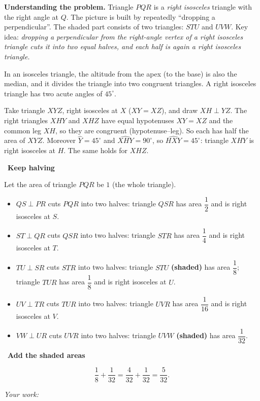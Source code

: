\documentclass[11pt]{article}
\newif\ifsol \solfalse
\newcommand{\probsol}[1]{%
  \begin{lrbox}{\solmeasure}\begin{minipage}{\dimexpr\linewidth-24pt\relax}#1\end{minipage}\end{lrbox}%
  \ifsol
    \begin{solbox}#1\end{solbox}%
  \else
    \setlength{\solht}{\dimexpr\ht\solmeasure+\dp\solmeasure+0.85cm\relax}%
    \ifdim\solht<1.35cm\setlength{\solht}{1.35cm}\fi
    \ifdim\solht>\StudentMaxWork\setlength{\solht}{\StudentMaxWork}\fi
    \begin{tcolorbox}[colback=white,colframe=Line,boxrule=0.8pt,arc=5pt,
      left=8pt,right=8pt,top=4pt,bottom=4pt,height=\solht]{\footnotesize\color{Slate}\itshape\WorkWord}\end{tcolorbox}%
  \fi}
\newlength{\StudentMaxWork}\setlength{\StudentMaxWork}{7.5cm}
\newcommand{\step}[2]{\par\smallskip\noindent{\bfseries\color{tmBlue!85!black}\StepWord~#1.}\ {\bfseries #2}\par\nopagebreak}
\def\WorkWord{Your work:}
\def\StepWord{Step}
\begin{document}
\probsol{
\textbf{Understanding the problem.} Triangle $PQR$ is a \emph{right isosceles} triangle with the right angle at $Q$. The picture is built by repeatedly ``dropping a perpendicular''. The shaded part consists of two triangles: $STU$ and $UVW$. Key idea: \emph{dropping a perpendicular from the right-angle vertex of a right isosceles triangle cuts it into two equal halves, and each half is again a right isosceles triangle.}

\begin{recallbox}In an isosceles triangle, the altitude from the apex (to the base) is also the median, and it divides the triangle into two congruent triangles. A right isosceles triangle has two acute angles of $45^\circ$.\end{recallbox}

\begin{proofbox}Take triangle $XYZ$, right isosceles at $X$ ($XY=XZ$), and draw $XH\perp YZ$. The right triangles $XHY$ and $XHZ$ have equal hypotenuses $XY=XZ$ and the common leg $XH$, so they are congruent (hypotenuse--leg). So each has half the area of $XYZ$. Moreover $\widehat{Y}=45^\circ$ and $\widehat{XHY}=90^\circ$, so $\widehat{HXY}=45^\circ$: triangle $XHY$ is right isosceles at $H$. The same holds for $XHZ$.\end{proofbox}

\step{1}{Keep halving}
Let the area of triangle $PQR$ be $1$ (the whole triangle).
\begin{itemize}[leftmargin=1.4em,itemsep=1pt]
\item $QS\perp PR$ cuts $PQR$ into two halves: triangle $QSR$ has area $\dfrac12$ and is right isosceles at $S$.
\item $ST\perp QR$ cuts $QSR$ into two halves: triangle $STR$ has area $\dfrac14$ and is right isosceles at $T$.
\item $TU\perp SR$ cuts $STR$ into two halves: triangle $STU$ \textbf{(shaded)} has area $\dfrac18$; triangle $TUR$ has area $\dfrac18$ and is right isosceles at $U$.
\item $UV\perp TR$ cuts $TUR$ into two halves: triangle $UVR$ has area $\dfrac1{16}$ and is right isosceles at $V$.
\item $VW\perp UR$ cuts $UVR$ into two halves: triangle $UVW$ \textbf{(shaded)} has area $\dfrac1{32}$.
\end{itemize}

\step{2}{Add the shaded areas}
\[\frac18+\frac1{32}=\frac{4}{32}+\frac{1}{32}=\frac{5}{32}.\]

}
\end{document}
